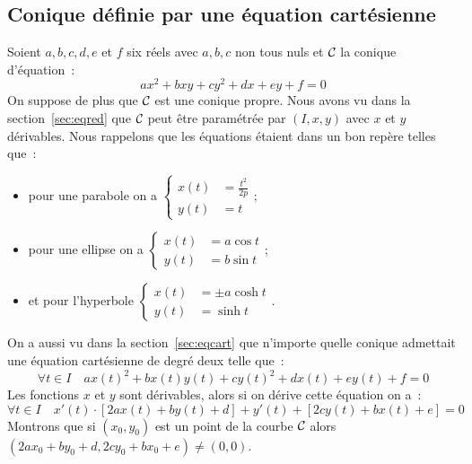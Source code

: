 \subsection{Conique définie par une équation cartésienne}
Soient \(a,b,c,d,e\) et \(f\) six réels avec \(a,b,c\) non tous nuls et \(\mathcal{C}_{{}}\) la conique d'équation~:
\begin{equation}
  ax^2+bxy+cy^2+dx+ey+f=0
\end{equation}
On suppose de plus que \(\mathcal{C}_{{}}\) est une conique propre. Nous avons vu dans la section~\ref{sec:eqred} que \(\mathcal{C}_{{}}\) peut être paramétrée par \((I,x,y)\) avec \(x\) et \(y\) dérivables. Nous rappelons que les équations étaient dans un bon repère telles que~:
\begin{itemize}
\item pour une parabole on a \(\begin{cases} x(t) &= \frac{t^2}{2p} \\ y(t) &= t \end{cases}\);
\item pour une ellipse on a \(\begin{cases} x(t) &= a\cos t\\ y(t) &= b\sin t \end{cases}\);
\item  et pour l'hyperbole \(\begin{cases} x(t) &= \pm a\cosh t\\ y(t) &= \sinh t \end{cases}\).
\end{itemize}
On a aussi vu dans la section~\ref{sec:eqcart} que n'importe quelle conique admettait une équation cartésienne de degré deux telle que~:
\begin{equation}
\forall t \in I \quad   ax(t)^2+bx(t)y(t)+cy(t)^2+dx(t)+ey(t)+f=0
\end{equation}
Les fonctions \(x\) et \(y\) sont dérivables, alors si on dérive cette équation on a~:
\begin{equation}
  \forall t \in I \quad x'(t) \cdot [2ax(t)+by(t)+d]+y'(t)+[2cy(t)+bx(t)+e]=0
\end{equation}
Montrons que si \((x_0,y_0)\) est un point de la courbe \(\mathcal{C}_{{}}\) alors \((2ax_0+by_0+d,2cy_0+bx_0+e)\neq (0,0)\).
